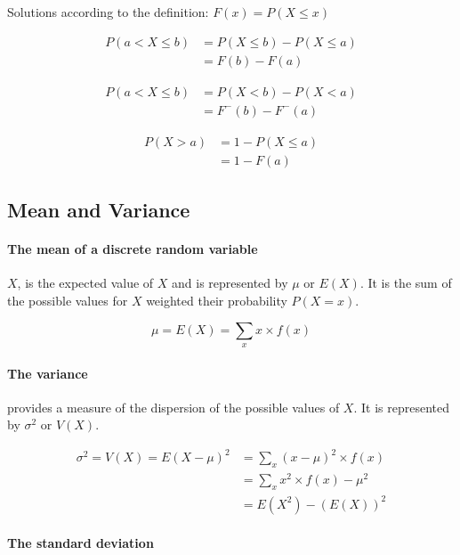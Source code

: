 \documentclass[12pt]{article}
\begin{document}
	Solutions according to the definition: \(F(x)=P(X\leq x)\)
	
	\begin{align*}
		P(a < X \leq b) &= P(X\leq b) - P(X\leq a) \\
		&= F(b) - F(a)
	\end{align*}
	
	\begin{align*}
		P(a < X \le b) &= P(X < b) - P(X < a) \\
		&= F^{-}(b) - F^{-}(a)
	\end{align*}
	
	\begin{align*}
		P(X > a) &= 1-P(X\leq a) \\
		&= 1-F(a)
	\end{align*}
	
	\subsection{Mean and Variance}
	
	\paragraph{The mean of a discrete random variable}
	
	\(X\), is the expected value of \(X\) and is represented by \(\mu\) or \(E(X)\). It is the sum of the possible values for \(X\) weighted their probability \(P(X=x)\).
	
	\begin{equation*}
		\mu = E(X) = \sum_{x}x\times f(x)
	\end{equation*}
	
	\paragraph{The variance}
	
	provides a measure of the dispersion of the possible values of \(X\). It is represented by \(\sigma ^2\) or \(V(X)\).
	
	\begin{align*}
		\sigma ^2 = V(X) = E(X-\mu)^2 &= \sum_{x}(x-\mu)^2\times f(x) \\
		&= \sum_{x}x^2\times f(x)-\mu ^2 \\
		&= E(X^2) - (E(X))^2
	\end{align*}
	
	\paragraph{The standard deviation}
	
\end{document}
